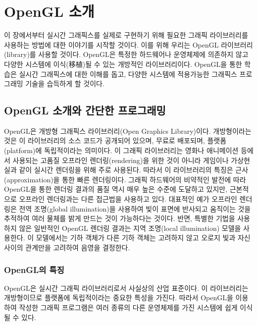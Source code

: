 \renewcommand\chapterillustration{OGL_opengl/chapterImage}



\chapter{OpenGL 소개}

이 장에서부터 실시간 그래픽스를 실제로 구현하기 위해 필요한 그래픽 라이브러리를 사용하는 방법에 대한 이야기를 시작할 것이다.
이를 위해 우리는 OpenGL 라이브러리(library)를 사용할 것이다.
OpenGL은 특정한 하드웨어나 운영체제에 의존하지 않고 다양한 시스템에 이식(移植)될 수 있는 개방적인 라이브러리이다.
OpenGL을 통한 학습은 실시간 그래픽스에 대한 이해를 돕고, 다양한 시스템에 적용가능한 그래픽스 프로그래밍 기술을 습득하게 할 것이다.

\section{OpenGL 소개와 간단한 프로그래밍}

OpenGL은 개방형 그래픽스 라이브러리(Open Graphics Library)이다. 개방형이라는 것은 이 라이브러리의 소스 코드가 공개되어 있으며, 무료로 배포되며, 플랫폼(platform)에 독립적이라는 의미이다. 이 그래픽 라이브러리는 영화나 애니메이션 등에서 사용되는 고품질 오프라인 렌더링(rendering)을 위한 것이 아니라 게임이나 가상현실과 같이 실시간 렌더링을 위해 주로 사용된다. 따라서 이 라이브러리의 특징은 근사(approximation)을 통한 빠른 렌더링이다. 그래픽 하드웨어의 비약적인 발전에 따라 OpenGL을 통한 렌더링 결과의 품질 역시 매우 높은 수준에 도달하고 있지만, 근본적으로 오프라인 렌더링과는 다른 접근법을 사용하고 있다. 대표적인 예가 오프라인 렌더링은 전역 조명(global illumination)을 사용하여 빛이 표면에 반사되고 움직이는 것을 추적하여 여러 물체를 밝게 만드는 것이 가능하다는 것이다. 반면, 특별한 기법을 사용하지 않은 일반적인 OpenGL 렌더링 결과는 지역 조명(local illumination) 모델을 사용한다. 이 모델에서는 기하 객체가 다른 기하 객체는 고려하지 않고 오로지 빛과 자신 사이의 관계만을 고려하여 음영을 결정한다. 

\subsection{OpenGL의 특징}
OpenGL은 실시간 그래픽 라이브러리로서 사실상의 산업 표준이다. 이 라이브러리는 개방형이므로 플랫폼에 독립적이라는 중요한 특성을 가진다. 따라서 OpenGL을 이용하여 작성한 그래픽 프로그램은 여러 종류의 다른 운영체제를 가진 시스템에 쉽게 이식될 수 있다.

